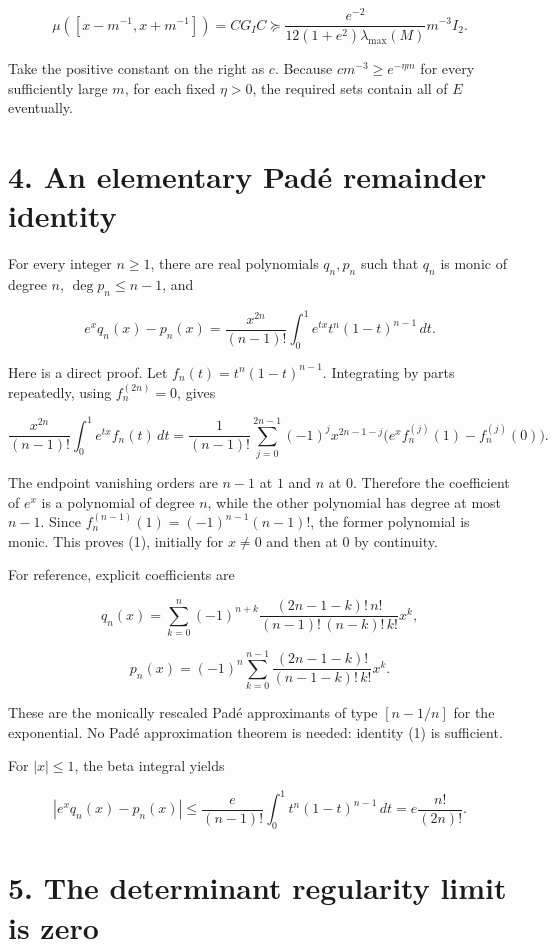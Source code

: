 \documentclass[11pt,a4paper]{article}
\begin{document}
\[
\mu([x-m^{-1},x+m^{-1}])=CG_I C
\succeq \frac{e^{-2}}{12(1+e^2)\lambda_{\max}(M)}m^{-3}I_2.
\]

Take the positive constant on the right as \(c\). Because
\(c m^{-3}\ge e^{-\eta m}\) for every sufficiently large \(m\), for each
fixed \(\eta>0\), the required sets contain all of \(E\) eventually.

\hypertarget{1035-an-elementary-paduxe9-remainder-identity}{%
\section{4. An elementary Padé remainder
identity}\label{1035-an-elementary-paduxe9-remainder-identity}}

For every integer \(n\ge1\), there are real polynomials \(q_n,p_n\) such
that \(q_n\) is monic of degree \(n\), \(\deg p_n\le n-1\), and

\[
e^x q_n(x)-p_n(x)
=\frac{x^{2n}}{(n-1)!}
\int_0^1 e^{tx}t^n(1-t)^{n-1}\,dt.
\tag{1}
\]

Here is a direct proof. Let \(f_n(t)=t^n(1-t)^{n-1}\). Integrating by
parts repeatedly, using \(f_n^{(2n)}=0\), gives

\[
\frac{x^{2n}}{(n-1)!}\int_0^1 e^{tx} f_n(t)\,dt
=\frac1{(n-1)!}\sum_{j=0}^{2n-1}(-1)^j x^{2n-1-j}
\bigl(e^x f_n^{(j)}(1)-f_n^{(j)}(0)\bigr).
\]

The endpoint vanishing orders are \(n-1\) at \(1\) and \(n\) at \(0\).
Therefore the coefficient of \(e^x\) is a polynomial of degree \(n\),
while the other polynomial has degree at most \(n-1\). Since
\(f_n^{(n-1)}(1)=(-1)^{n-1}(n-1)!\), the former polynomial is monic.
This proves (1), initially for \(x\ne0\) and then at \(0\) by
continuity.

For reference, explicit coefficients are

\[
q_n(x)=\sum_{k=0}^{n}(-1)^{n+k}
\frac{(2n-1-k)!\,n!}{(n-1)!\,(n-k)!\,k!}x^k,
\]

\[
p_n(x)=(-1)^n\sum_{k=0}^{n-1}
\frac{(2n-1-k)!}{(n-1-k)!\,k!}x^k.
\]

These are the monically rescaled Padé approximants of type \([n-1/n]\)
for the exponential. No Padé approximation theorem is needed: identity
(1) is sufficient.

For \(|x|\le1\), the beta integral yields

\[
|e^xq_n(x)-p_n(x)|
\le\frac{e}{(n-1)!}\int_0^1t^n(1-t)^{n-1}\,dt
= e\frac{n!}{(2n)!}.
\tag{2}
\]

\hypertarget{1035-the-determinant-regularity-limit-is-zero}{%
\section{5. The determinant regularity limit is
zero}\label{1035-the-determinant-regularity-limit-is-zero}}
\end{document}
